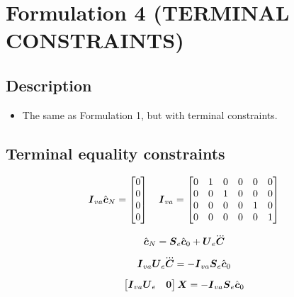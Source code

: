 \section{Formulation 4 (TERMINAL CONSTRAINTS)}\label{sec.form04}


\subsection{Description}
\begin{itemize}
    \item The same as Formulation 1, but with terminal constraints.
\end{itemize}



\subsection{Terminal equality constraints}
\begin{equation*}
    \mbox{\boldmath $I$}_{va} \hat{\mbox{\boldmath $c$}}_N =
        \begin{bmatrix}
            0 \\
            0 \\
            0 \\
            0 \\
        \end{bmatrix}
    \quad
    \mbox{\boldmath $I$}_{va} =
        \begin{bmatrix}
            0 & 1 & 0 & 0 & 0 & 0 \\
            0 & 0 & 1 & 0 & 0 & 0 \\
            0 & 0 & 0 & 0 & 1 & 0 \\
            0 & 0 & 0 & 0 & 0 & 1 \\
        \end{bmatrix}
\end{equation*}

\begin{equation*}
    \cstate_N = \M{S}_e \cstate_0     +   \M{U}_e \cJerk
\end{equation*}

\begin{equation*}
    \M{I}_{va} \M{U}_e \cJerk = - \M{I}_{va} \M{S}_e \cstate_0
\end{equation*}

\begin{equation*}
    \begin{bmatrix}
        \mbox{\boldmath $I$}_{va} \mbox{\boldmath $U$}_e  & \mbox{\boldmath $0$}\\
    \end{bmatrix}
    \mbox{\boldmath $X$} 
    = 
    - \mbox{\boldmath $I$}_{va} \mbox{\boldmath $S$}_e \hat{\mbox{\boldmath $c$}}_0
\end{equation*}
